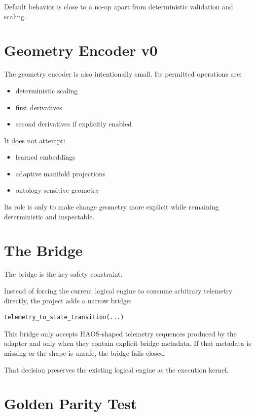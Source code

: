 \documentclass[11pt]{article}
\begin{document}
Default behavior is close to a no-op apart from deterministic validation and scaling.

\section{Geometry Encoder v0}

The geometry encoder is also intentionally small.
Its permitted operations are:

\begin{itemize}
\item deterministic scaling
\item first derivatives
\item second derivatives if explicitly enabled
\end{itemize}

It does not attempt:

\begin{itemize}
\item learned embeddings
\item adaptive manifold projections
\item ontology-sensitive geometry
\end{itemize}

Its role is only to make change geometry more explicit while remaining deterministic and inspectable.

\section{The Bridge}

The bridge is the key safety constraint.

Instead of forcing the current logical engine to consume arbitrary telemetry directly, the project adds a narrow bridge:

\begin{verbatim}
telemetry_to_state_transition(...)
\end{verbatim}

This bridge only accepts HAOS-shaped telemetry sequences produced by the adapter and only when they contain explicit bridge metadata.
If that metadata is missing or the shape is unsafe, the bridge fails closed.

That decision preserves the existing logical engine as the execution kernel.

\section{Golden Parity Test}
\end{document}
